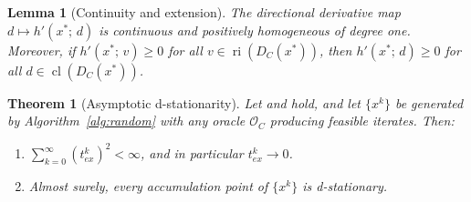 \documentclass[10pt,a4paper]{amsart}
\newtheorem{theorem}{Theorem}
\newtheorem{lemma}{Lemma}
\DeclareMathOperator{\cl}{cl}
\DeclareMathOperator{\ri}{ri}
\begin{document}
\begin{lemma}[Continuity and extension]\label{lem:continuity}
The directional derivative map $d \mapsto h'(x^*;\, d)$ is continuous and positively homogeneous of degree one. Moreover, if $h'(x^*;\, v) \geq 0$ for all $v \in \ri(D_C(x^*))$, then $h'(x^*;\, d) \geq 0$ for all $d \in \cl(D_C(x^*))$.
\end{lemma}

\begin{theorem}[Asymptotic d-stationarity]\label{thm:random}
Let   and  hold, and let $\{x^k\}$ be generated by Algorithm~\ref{alg:random} with any oracle $\mathcal{O}_C$ producing feasible iterates. Then:
\begin{enumerate}
\item[(i)] $\sum_{k=0}^{\infty}(t^k_{ex})^2 < \infty$, and in particular $t^k_{ex} \to 0$.
\item[(ii)] Almost surely, every accumulation point of $\{x^k\}$ is d-stationary.
\end{enumerate}
\end{theorem}
\end{document}
